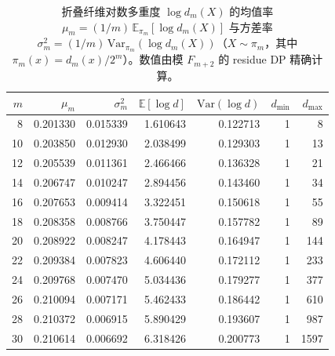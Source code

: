 \begin{table}[H]
\centering
\scriptsize
\setlength{\tabcolsep}{6pt}
\caption{折叠纤维对数多重度 $\log d_m(X)$ 的均值率 $\mu_m=(1/m)\,\mathbb{E}_{\pi_m}[\log d_m(X)]$ 与方差率 $\sigma_m^2=(1/m)\,\mathrm{Var}_{\pi_m}(\log d_m(X))$（$X\sim\pi_m$，其中 $\pi_m(x)=d_m(x)/2^m$）。数值由模 $F_{m+2}$ 的 residue DP 精确计算。}
\label{tab:fold_fiber_log_moments_mu_sigma}
\begin{tabular}{r r r r r r r}
\toprule
$m$ & $\mu_m$ & $\sigma_m^2$ & $\mathbb{E}[\log d]$ & $\mathrm{Var}(\log d)$ & $d_{\min}$ & $d_{\max}$\\
\midrule
8 & 0.201330 & 0.015339 & 1.610643 & 0.122713 & 1 & 8\\
10 & 0.203850 & 0.012930 & 2.038499 & 0.129303 & 1 & 13\\
12 & 0.205539 & 0.011361 & 2.466466 & 0.136328 & 1 & 21\\
14 & 0.206747 & 0.010247 & 2.894456 & 0.143460 & 1 & 34\\
16 & 0.207653 & 0.009414 & 3.322451 & 0.150618 & 1 & 55\\
18 & 0.208358 & 0.008766 & 3.750447 & 0.157782 & 1 & 89\\
20 & 0.208922 & 0.008247 & 4.178443 & 0.164947 & 1 & 144\\
22 & 0.209384 & 0.007823 & 4.606440 & 0.172112 & 1 & 233\\
24 & 0.209768 & 0.007470 & 5.034436 & 0.179277 & 1 & 377\\
26 & 0.210094 & 0.007171 & 5.462433 & 0.186442 & 1 & 610\\
28 & 0.210372 & 0.006915 & 5.890429 & 0.193607 & 1 & 987\\
30 & 0.210614 & 0.006692 & 6.318426 & 0.200773 & 1 & 1597\\
\bottomrule
\end{tabular}
\end{table}
